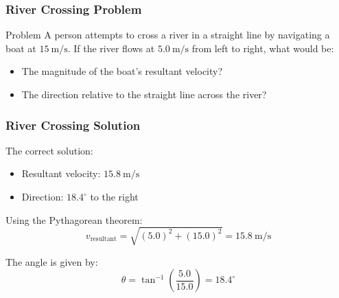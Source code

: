 \documentclass{beamer}
\begin{document}
\begin{frame}
\frametitle{River Crossing Problem}
\begin{block}{Problem}
A person attempts to cross a river in a straight line by navigating a boat at $15 \mathrm{~m} / \mathrm{s}$. If the river flows at $5.0 \mathrm{~m} / \mathrm{s}$ from left to right, what would be:
\begin{itemize}
    \item The magnitude of the boat's resultant velocity?
    \item The direction relative to the straight line across the river?
\end{itemize}
\end{block}

\begin{center}
\end{center}

\end{frame}

\begin{frame}
\frametitle{River Crossing Solution}

The correct solution:
\begin{itemize}
    \item Resultant velocity: $15.8 \mathrm{~m} / \mathrm{s}$
    \item Direction: $18.4^{\circ}$ to the right
\end{itemize}


Using the Pythagorean theorem:
\[v_\text{resultant} = \sqrt{(5.0)^2 + (15.0)^2} = 15.8 \mathrm{~m}/\mathrm{s}\]

The angle is given by:
\[\theta = \tan^{-1}\left(\frac{5.0}{15.0}\right) = 18.4^\circ\]

\end{frame}
\end{document}
